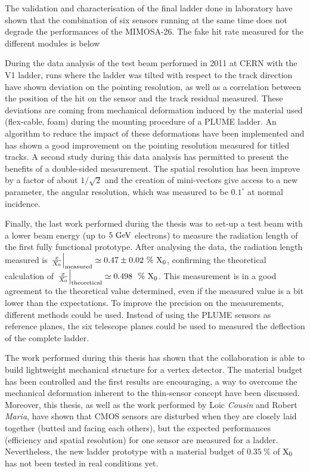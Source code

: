 The validation and characterisation of the final ladder done in laboratory have shown that the combination of six sensors running at the same time does not degrade the performances of the \gls{MIMOSA}-26.
The fake hit rate measured for the different modules is below 

During the data analysis of the test beam performed in 2011 at \gls{CERN} with the V1 ladder, runs where the ladder was tilted with respect to the track direction have shown deviation on the pointing resolution, as well as a correlation between the position of the hit on the sensor and the track residual measured.
These deviations are coming from mechanical deformation induced by the material used (flex-cable, foam) during the mounting procedure of a \gls{PLUME} ladder.
An algorithm to reduce the impact of these deformations have been implemented and has shown a good improvement on the pointing resolution measured for titled tracks.
A second study during this data analysis has permitted to present the benefits of a double-sided measurement. 
The spatial resolution has been improve by a factor of about $1/\sqrt{2}$ and the creation of mini-vectors give access to a new parameter, the angular resolution, which was measured to be $0.1^{\circ}$ at normal incidence.

Finally, the last work performed during the thesis was to set-up a test beam with a lower beam energy (up to $5~\rm{GeV}$ electrons) to measure the radiation length of the first fully functional prototype.
After analysing the data, the radiation length measured is $\left. \frac{x}{X_0} \right|_{\rm{measured}} \simeq 0.47 \pm 0.02~\%~\rm{X_0}$, confirming the theoretical calculation of $\left. \frac{x}{X_0}\right|_{\rm{theoretical}} \simeq 0.498~~\%~\rm{X_0}$.
This measurement is in a good agreement to the theoretical value determined, even if the measured value is a bit lower than the expectations. 
To improve the precision on the measurements, different methods could be used.
Instead of using the \gls{PLUME} sensors as reference planes, the six telescope planes could be used to measured the deflection of the complete ladder.


The work performed during this thesis has shown that the collaboration is able to build lightweight mechanical structure for a vertex detector.
The material budget has been controlled and the first results are encouraging, a way to overcome the mechanical deformation inherent to the thin-sensor concept have been discussed.
Moreover, this thesis, as well as the work performed by Loic \textit{Cousin} and Robert \textit{Maria}, have shown that \gls{CMOS} sensors are disturbed when they are closely laid together (butted and facing each others), but the expected performances (efficiency and spatial resolution) for one sensor are measured for a ladder.
Nevertheless, the new ladder prototype with a material budget of $0.35~\%$ of $\rm{X_{0}}$ has not been tested in real conditions yet.



